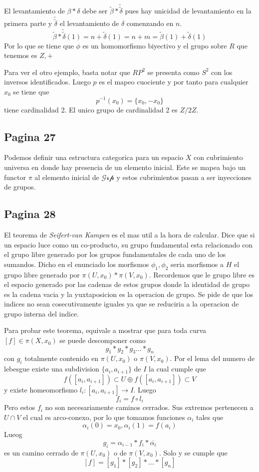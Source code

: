 \documentclass[letterpaper]{article}
\newcommand{\vank}{\emph{Seifert-van Kampen} }
\begin{document}
El levantamiento de \(\beta * \delta \) debe ser \(\tilde \beta
* \tilde {\tilde \delta}\) pues hay unicidad de levantamiento en la
primera parte y \(\tilde {\tilde \delta}\) el levantamiento de
\(\delta\) comenzando en \(n\).
\[ \tilde \beta * \tilde {\tilde \delta} (1) = n + \tilde \delta (1) =
  n + m = \tilde \beta (1) + \tilde \delta (1) \]
Por lo que se tiene que \(\phi \) es un homomorfismo biyectivo y el
grupo sobre \(R\) que tenemos es \(Z, +\)

Para ver el otro ejemplo, basta notar que \(RP^2\) se presenta como
\(S^2 \) con los inversos identificados. Luego \(p\) es el mapeo cuociente
y por tanto para cualquier \(x_0\) se tiene que
\[ p^{-1} (x_0) = \{x_0 , - x_0\}\]
tiene cardinalidad 2. El unico grupo de cardinalidad 2 es \(Z/2Z\).

\subsection*{Pagina 27}
Podemos definir una estructura categorica para un espacio \(X\) con
cubrimiento universa en donde hay presencia de un elemento inicial. Este
se mapea bajo un functor \(\pi\) al elemento inicial de
\(\mathscr{Grp}\) y estos cubrimientos pasan a ser inyecciones de grupos.

\subsection*{Pagina 28}
El teorema de \vank es el mas util a la hora de calcular. Dice que si un
espacio luce como un co-producto, su grupo fundamental esta relacionado
con el grupo libre generado por los grupos fundamentales de cada uno de
los sumandos. Dicho en el enunciado los morfismos \(\phi_1, \phi_2\)
seria morfismos a \(H\) el grupo libre generado por \(\pi (U,x_0) * \pi
(V,x_0)\). Recordemos que le grupo libre es el espacio generado por las
cadenas de estos grupos donde la identidad de grupo es la cadena vacia y
la yuxtaposicion es la operacion de grupo. Se pide de que los indices no
sean cosecutivamente iguales ya que se reduciria a la operacion de grupo
interna del indice.

Para probar este teorema, equivale a mostrar que para toda curva \([f]
\in \pi (X,x_0)\) se puede descomponer como
\[ g_1 * g_2 * g_3 \dots * g_n \]
con \(g_i\) totalmente contenido en \(\pi (U, x_0)\) o \(\pi (V, x_0)\).
Por el lema del numero de lebesgue existe una subdivision \(\{a_i ,
a_{i+1}\}\) de \(I\) la cual cumple que
\[ f \left( [a_i , a_{i+1}] \right) \subset U  \oplus f \left( [a_i ,
    a_{i+1}] \right) \subset V \]
y existe homeomorfismo \(l_i : [a_i , a_{i+1}] \to I \). Luego
\[ f_i = f \circ l_i \]
Pero estos \(f_i\) no son necesariamente caminos cerrados. Sus extremos
pertenecen a \(U \cap V\) el cual es arco-conexo, por lo que tomamos
funciones \(\alpha_i\) tales que
\[ \alpha_i (0) = x_0 , \alpha_i (1) = f(a_i)\]
Lueog
\[ g_i = \alpha_{i-1} * f_i * \overline{\alpha_i} \]
es un camino cerrado de \(\pi(U, x_0)\) o de \(\pi (V,x_0)\). Solo y se
cumple que
\[ [f] = [g_1] * [g_2] * \dots * [g_n] \]
\end{document}
